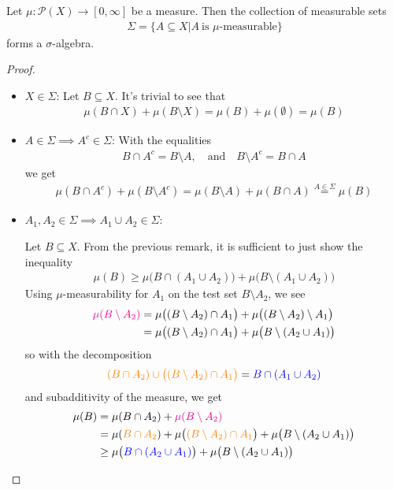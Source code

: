 \begin{thm}[] \label{thm:measurable-is-sigma-algebra}
  Let $\mu: \mathcal{P}(X) \to [0,\infty]$ be a measure. Then the collection of measurable sets
  \begin{align*}
    \Sigma = \{A \subseteq X \big\vert A\ \text{is $\mu$-measurable}\}
  \end{align*}
  forms a $\sigma$-algebra.
\end{thm}
\begin{proof}
  \phantom{a}
\begin{itemize}
  \item $X\in \Sigma$: 
    Let $B \subseteq X$. It's trivial to see that
    \begin{align*}
      \mu(B \cap X) + \mu(B \setminus X) = \mu(B) + \mu(\emptyset) = \mu(B)
    \end{align*}
  \item $A \in \Sigma \implies A^{c} \in \Sigma$: With the equalities
    \begin{align*}
      B \cap A^{c} = B \setminus A, \quad \text{and} \quad B \setminus A^{c} = B \cap A
    \end{align*}
    we get 
    \begin{align*}
      \mu(B \cap A^{c}) + \mu(B \setminus A^{c}) = \mu(B \setminus A) + \mu(B \cap A) \stackrel{A \in \Sigma}{=} \mu(B)
    \end{align*}
  \item $A_1,A_2 \in \Sigma \implies A_1 \cup A_2 \in \Sigma$: 

    Let $B \subseteq X$. From the previous remark, it is sufficient to just show the inequality
    \begin{align*}
      \mu(B) \geq \mu\big(B \cap (A_1 \cup A_2)\big) + \mu \big(B \setminus (A_1 \cup A_2)\big)
    \end{align*}
    Using $\mu$-measurability for $A_1$ on the test set $B \setminus A_2$, we see
    \begin{align*}
      {\color{magenta}\mu(B \setminus A_2)}
      &= 
      \mu\big((B \setminus A_2) \cap A_1\big) + \mu \big((B \setminus A_2) \setminus A_1\big)\\
      &= 
      \mu \big((B \setminus A_2) \cap A_1\big) 
      + 
      \mu \big(B \setminus (A_2 \cup A_1)\big)
    \end{align*}
    so with the decomposition
    \begin{align*}
      {\color{orange}(B \cap A_2) \cup \big((B \setminus A_2) \cap A_1\big)} = {\color{blue}B \cap (A_1 \cup A_2)}
    \end{align*}  
    and subadditivity of the measure, we get
    \begin{align*}
      \mu(B) 
      &= \mu(B \cap A_2) + {\color{magenta}\mu(B \setminus A_2)}\\
      &=  \mu({\color{orange}B \cap A_2}) 
      + \mu \big({\color{orange}(B \setminus A_2) \cap A_1}\big) 
        + \mu \big(B \setminus (A_2 \cup A_1)\big)\\
      &\geq \mu \big({\color{blue}B \cap (A_2 \cup A_1)}\big) 
        + \mu \big(B \setminus (A_2 \cup A_1)\big)
    \end{align*}



\end{itemize}
\end{proof}
